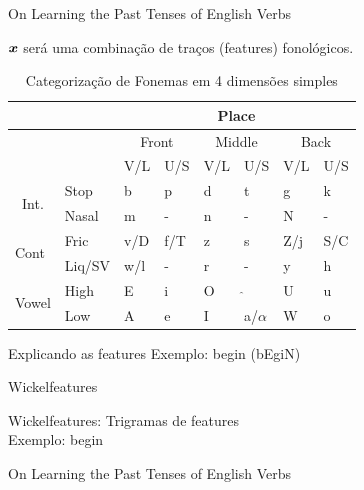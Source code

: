 \documentclass[10pt]{beamer}
\begin{document}
\begin{frame}[fragile]{On Learning the Past Tenses of English Verbs}

$\bm{x}$ será uma combinação de traços (features) fonológicos.

\begin{table}[]
\centering
\caption{Categorização de Fonemas em 4 dimensões simples}
\label{fontable}
\begin{tabular}{llllllll}
\hline
 &  & \multicolumn{6}{c}{Place} \\ \hline
 &  & \multicolumn{2}{c|}{Front} & \multicolumn{2}{c|}{Middle} & \multicolumn{2}{c}{Back} \\ \hline
 &  & \multicolumn{1}{l|}{V/L} & \multicolumn{1}{l|}{U/S} & \multicolumn{1}{l|}{V/L} & \multicolumn{1}{l|}{U/S} & \multicolumn{1}{l|}{V/L} & U/S \\ \hline
 \multicolumn{1}{c}{\multirow{2}{*}{Int.}} & Stop & b & p & d & t & g & k \\ \cline{2-8} 
\multicolumn{1}{c}{} & Nasal & m & - & n & - & N & - \\ \hline
\multirow{2}{*}{Cont} & Fric & v/D & f/T & z & s & Z/j & S/C \\ \cline{2-8} 
 & Liq/SV & w/l & - & r & - & y & h \\ \hline
 \multirow{2}{*}{Vowel} & High & E & i & O & $\hat{}$ & U & u \\ \cline{2-8} 
 & Low & A & e & I & a/$\alpha$ & W & o \\ \hline
\end{tabular}
\end{table}

\end{frame}

\begin{frame}[fragile]{Explicando as features}
Exemplo: begin (bEgiN)
\vspace{1cm}
\\


\end{frame}

\begin{frame}[fragile]{Wickelfeatures}

Wickelfeatures: Trigramas de features
\vspace{0.4cm}
\\Exemplo: begin

\end{frame}



\begin{frame}[fragile]{On Learning the Past Tenses of English Verbs}

\end{frame}
\end{document}
